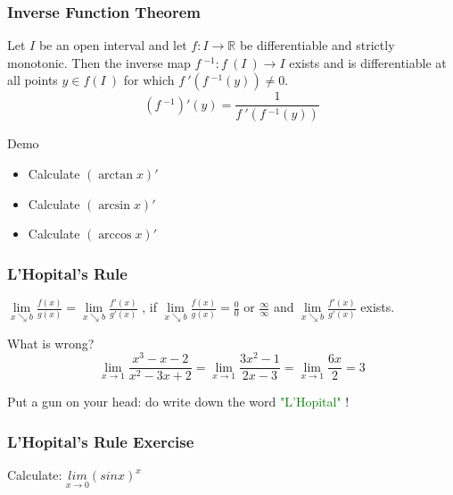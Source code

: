 \documentclass{beamer}
\begin{document}
\begin{frame}
    \frametitle{Inverse Function Theorem}
    \hspace{1em}
    Let $I$ be an open interval and let $f : I \to \mathbb{R}$ be
    differentiable and strictly monotonic. Then the inverse map
    $f~^{-1} : f~(I~) \to I$ exists and is differentiable at all points $y \in f (I~)$ for
    which $f~'(f~^{-1}(y)) \neq 0$.
    \large{$$(f~^{-1})'(y)=\frac{1}{f~'(f~^{-1}(y))}$$}
    \begin{block}{Demo}
        \begin{itemize}
            \item Calculate $(\arctan x)'$
            \item Calculate $(\arcsin x)'$
            \item Calculate $(\arccos x)'$
        \end{itemize}
    \end{block}
\end{frame}
\begin{frame}
    \frametitle{L'Hopital's Rule}
    \begin{center}
        \vspace{1em}
        \large{$\underset{x\searrow b}{\lim}\frac{f(x)}{g(x)}=\underset{x\searrow b}{\lim}\frac{f'(x)}{g'(x)}$
            , if $\underset{x\searrow b}{\lim}\frac{f(x)}{g(x)}=\frac{0}{0}\text{ or }\frac{\infty}{\infty}$ and $\underset{x\searrow b}{\lim}\frac{f'(x)}{g'(x)}$ exists.}
    \end{center}
    \vspace{2em}
    \begin{block}{What is wrong?}
        \begin{equation*}
            \underset{x\rightarrow 1}{\lim}\frac{x^3-x-2}{x^2-3x+2}=\underset{x\rightarrow 1}{\lim}\frac{3x^2-1}{2x-3}=\underset{x\rightarrow 1}{\lim}\frac{6x}{2}=3
        \end{equation*}
    \end{block}
    \vspace{1em}
    Put a gun on your head: do write down the word \textcolor{green}{"L'Hopital"} !
\end{frame}

\begin{frame}
    \frametitle{L'Hopital's Rule Exercise}
    \begin{center}
        Calculate:  $\underset{x\rightarrow 0}{lim}(sin x)^{x}$
    \end{center}
\end{frame}
\end{document}
